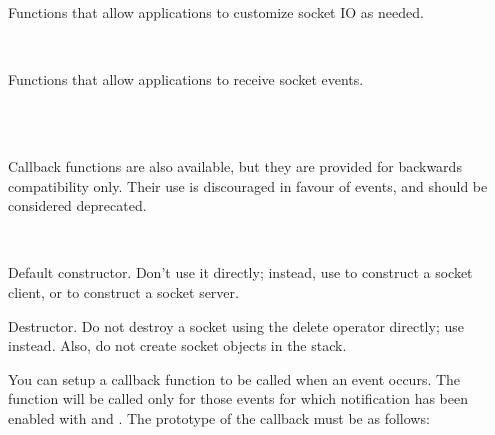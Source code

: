 Functions that allow applications to customize socket IO as needed.

\\


Functions that allow applications to receive socket events.

\\
\\

Callback functions are also available, but they are provided for backwards
compatibility only. Their use is discouraged in favour of events, and should
be considered deprecated.

\\




\label{wxsocketbaseconstruct}


Default constructor. Don't use it directly; instead, use
 to construct a socket client, or
 to construct a socket server.

\label{wxsocketbasedestruct}


Destructor. Do not destroy a socket using the delete operator directly;
use  instead. Also, do not create socket
objects in the stack.

%
%
\label{wxsocketbasecallback}


You can setup a callback function to be called when an event occurs.
The function will be called only for those events for which notification
has been enabled with  and
. The prototype of the
callback must be as follows:

